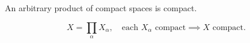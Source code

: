 An arbitrary product of compact spaces is compact.

\[
X = \prod_{\alpha} X_{\alpha}, \quad \text{each } X_{\alpha} \text{ compact} \implies X \text{ compact}.
\]
